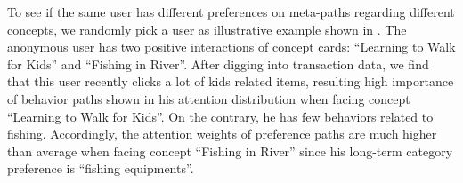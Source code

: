 To see if the same user has different preferences on meta-paths regarding different concepts,
 we randomly pick a user as illustrative example shown in .
The anonymous user has two positive interactions of concept cards: ``Learning to Walk for Kids'' and ``Fishing in River''.
After digging into transaction data,
we find that this user recently clicks a lot of kids related items, resulting high importance of behavior paths shown in his attention distribution when facing concept ``Learning to Walk for Kids''.
On the contrary, he has few behaviors related to fishing. 
Accordingly, the attention weights of preference paths are much higher than average when facing concept ``Fishing in River'' since his long-term category preference is ``fishing equipments''.











